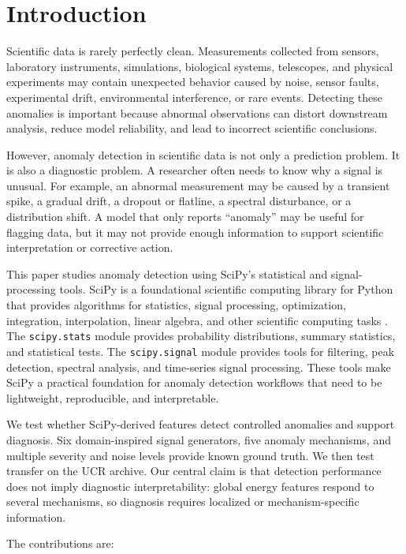 \section{Introduction}

Scientific data is rarely perfectly clean. Measurements collected from sensors, laboratory instruments, simulations, biological systems, telescopes, and physical experiments may contain unexpected behavior caused by noise, sensor faults, experimental drift, environmental interference, or rare events. Detecting these anomalies is important because abnormal observations can distort downstream analysis, reduce model reliability, and lead to incorrect scientific conclusions.

However, anomaly detection in scientific data is not only a prediction problem. It is also a diagnostic problem. A researcher often needs to know why a signal is unusual. For example, an abnormal measurement may be caused by a transient spike, a gradual drift, a dropout or flatline, a spectral disturbance, or a distribution shift. A model that only reports ``anomaly'' may be useful for flagging data, but it may not provide enough information to support scientific interpretation or corrective action.

This paper studies anomaly detection using SciPy's statistical and signal-processing tools. SciPy is a foundational scientific computing library for Python that provides algorithms for statistics, signal processing, optimization, integration, interpolation, linear algebra, and other scientific computing tasks \citep{virtanen2020scipy}. The \texttt{scipy.stats} module provides probability distributions, summary statistics, and statistical tests. The \texttt{scipy.signal} module provides tools for filtering, peak detection, spectral analysis, and time-series signal processing. These tools make SciPy a practical foundation for anomaly detection workflows that need to be lightweight, reproducible, and interpretable.

We test whether SciPy-derived features detect controlled anomalies and support diagnosis. Six domain-inspired signal generators, five anomaly mechanisms, and multiple severity and noise levels provide known ground truth. We then test transfer on the UCR archive. Our central claim is that detection performance does not imply diagnostic interpretability: global energy features respond to several mechanisms, so diagnosis requires localized or mechanism-specific information.

The contributions are:

